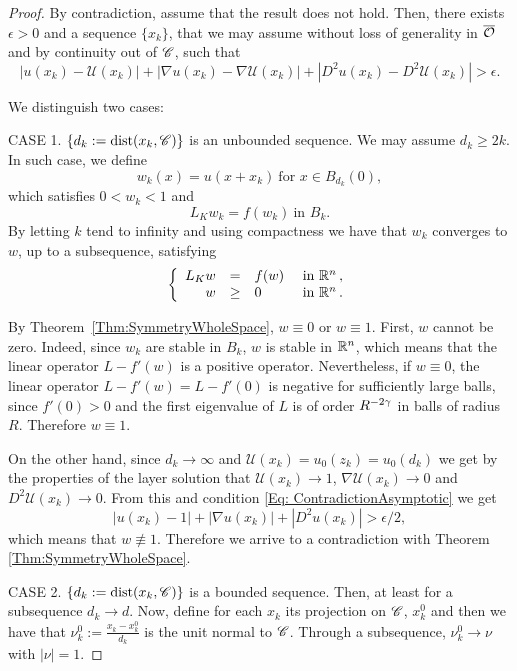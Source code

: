 \begin{proof}
By contradiction, assume that the result does not hold. Then, there exists $\epsilon>0$ and a sequence $\{x_k\}$, that we may assume without loss of generality in $\overline{\mathcal{O}}$ and by continuity out of ${\mathscr{C}}$, such that
\begin{equation}
\label{Eq:ContradictionAsymptotic}
|u(x_k)-\mathcal{U}(x_k)|+|\nabla u(x_k)-\nabla \mathcal{U}(x_k)|+|D^2u(x_k)-D^2\mathcal{U}(x_k)| > \epsilon.
\end{equation}


We distinguish two cases:

CASE 1. $\{d_k:=\operatorname{dist}(x_k,\mathscr{C})\}$ is an unbounded sequence. We may assume $d_k \geq 2k$.\\
In such case, we define
$$
w_k(x) = u(x+x_k)  \ \textrm{for } x\in B_{d_k}(0), 
$$
which satisfies $0<w_k<1$ and
$$
L_K w_k = f(w_k) \ \textrm{in } B_k.
$$
By letting $k$ tend to infinity and using compactness  we have that $w_k$ converges to $w$, up to a subsequence, satisfying
$$
\left\{\begin{array}{rcll}
L_K  w &=& f(w) & \textrm{ in }\mathbb{R}^n\,,\\
w &\geq& 0 & \textrm{ in } \mathbb{R}^n\,.
\end{array} \right.
$$

By Theorem~\ref{Thm:SymmetryWholeSpace}, $w\equiv 0$ or $w\equiv 1$. First, $w$ cannot be zero. Indeed, since $w_k$ are stable in $B_k$, $w$ is stable in $\mathbb{R}^n$, which means that the linear operator $L-f'(w)$ is a positive operator. Nevertheless, if $w\equiv 0$, the linear operator $L-f'(w) = L-f'(0)$ is negative for sufficiently large balls, since $f'(0)>0$ and the first eigenvalue of $L$ is of order $R^{-2\gamma}$ in balls of radius $R$. Therefore $w\equiv 1$. 

On the other hand, since $d_k\rightarrow \infty$  and $\mathcal{U}(x_k) = u_0(z_k) = u_0(d_k)$ we get by the properties of the layer solution  that $\mathcal{U}(x_k) \rightarrow 1$, $\nabla \mathcal{U}(x_k) \rightarrow 0$ and $D^2\mathcal{U}(x_k) \rightarrow 0$. From this and condition \eqref{Eq: ContradictionAsymptotic} we get
$$
|u(x_k)-1|+|\nabla u(x_k)|+|D^2u(x_k)| > \epsilon/2,
$$
which means that $w \not\equiv 1$. Therefore we arrive to a contradiction with Theorem \ref{Thm:SymmetryWholeSpace}.

CASE 2. $\{d_k:=\operatorname{dist}(x_k,\mathscr{C})\}$ is a bounded sequence.
Then, at least for a subsequence $d_k \rightarrow d$. Now, define for each $x_k$ its projection on $\mathscr{C}$, $x_k^0$ and then we have that $ \nu_k^0 := \frac{x_k-x_k^0}{d_k}$ is the unit normal to $\mathscr{C}$. Through a subsequence, $ \nu_k^0 \rightarrow \nu$ with $|\nu|=1$.


\end{proof}
